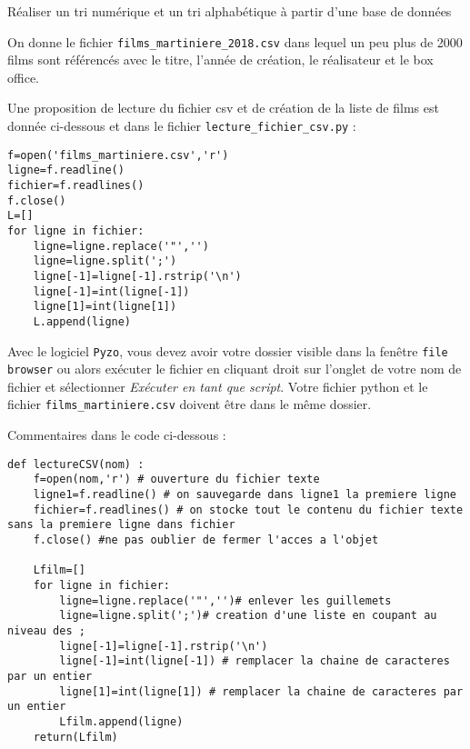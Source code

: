 \setcounter{numques}{0}

\begin{obj}
Réaliser un tri numérique et un tri alphabétique à partir d'une base de données
\end{obj}

On donne le fichier \texttt{films\_martiniere\_2018.csv} dans lequel un peu plus de 2000 films sont référencés avec le titre, l'année de création, le réalisateur et le box office.

Une proposition de lecture du fichier csv et de création de la liste de films est donnée ci-dessous et dans le fichier \texttt{lecture\_fichier\_csv.py} :

\begin{lstlisting}
f=open('films_martiniere.csv','r')
ligne=f.readline()
fichier=f.readlines()
f.close()
L=[]
for ligne in fichier:
    ligne=ligne.replace('"','')
    ligne=ligne.split(';')
    ligne[-1]=ligne[-1].rstrip('\n')
    ligne[-1]=int(ligne[-1])
    ligne[1]=int(ligne[1])
    L.append(ligne)
\end{lstlisting}
%
Avec le logiciel \texttt{Pyzo}, vous devez avoir votre dossier visible dans la fenêtre \texttt{file browser} ou alors exécuter le fichier en cliquant droit sur l'onglet de votre nom de fichier et sélectionner \textit{Exécuter en tant que script}. Votre fichier python et le fichier \texttt{films\_martiniere.csv} doivent être dans le même dossier.

\ifprof
Commentaires dans le code ci-dessous :
\begin{lstlisting}
def lectureCSV(nom) :
    f=open(nom,'r') # ouverture du fichier texte
    ligne1=f.readline() # on sauvegarde dans ligne1 la premiere ligne
    fichier=f.readlines() # on stocke tout le contenu du fichier texte sans la premiere ligne dans fichier
    f.close() #ne pas oublier de fermer l'acces a l'objet
    
    Lfilm=[]
    for ligne in fichier:
        ligne=ligne.replace('"','')# enlever les guillemets
        ligne=ligne.split(';')# creation d'une liste en coupant au niveau des ;
        ligne[-1]=ligne[-1].rstrip('\n')
        ligne[-1]=int(ligne[-1]) # remplacer la chaine de caracteres par un entier
        ligne[1]=int(ligne[1]) # remplacer la chaine de caracteres par un entier
        Lfilm.append(ligne)
    return(Lfilm)
\end{lstlisting}
\else
\fi

